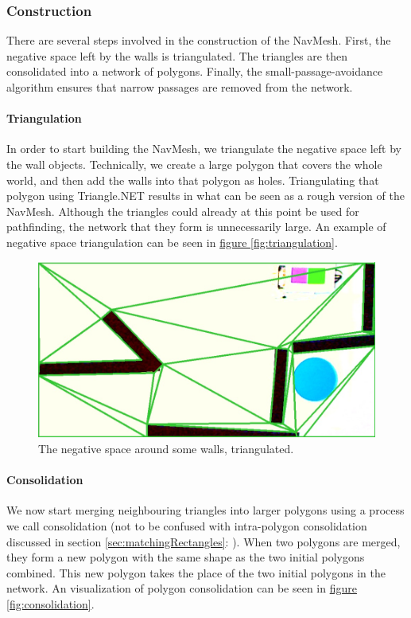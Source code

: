 \documentclass[10pt, abstracton]{scrartcl}
\newcommand{\fref}[1]{\hyperref[#1]{figure \vref{#1}}}
\newcommand{\sref}[1]{section \vref{#1}: \nameref{#1}}
\begin{document}
\subsubsection{Construction}
There are several steps involved in the construction of the NavMesh. First, the negative space left by the walls is triangulated. The triangles are then consolidated into a network of polygons. Finally, the small-passage-avoidance algorithm ensures that narrow passages are removed from the network.

\paragraph{Triangulation}
In order to start building the NavMesh, we triangulate the negative space left by the wall objects. Technically, we create a large polygon that covers the whole world, and then add the walls into that polygon as holes. Triangulating that polygon using Triangle.NET results in what can be seen as a rough version of the NavMesh. Although the triangles could already at this point be used for pathfinding, the network that they form is unnecessarily large. An example of negative space triangulation can be seen in \fref{fig:triangulation}.

\begin{figure}
	\centering
	\includegraphics[width=\columnwidth]{pictures/triangulation.png}
	\caption{\small The negative space around some walls, triangulated.}
	\label{fig:triangulation}
\end{figure}

\paragraph{Consolidation}
We now start merging neighbouring triangles into larger polygons using a process we call consolidation (not to be confused with intra-polygon consolidation discussed in \sref{sec:matchingRectangles}). When two polygons are merged, they form a new polygon with the same shape as the two initial polygons combined. This new polygon takes the place of the two initial polygons in the network. An visualization of polygon consolidation can be seen in \fref{fig:consolidation}.
\end{document}
